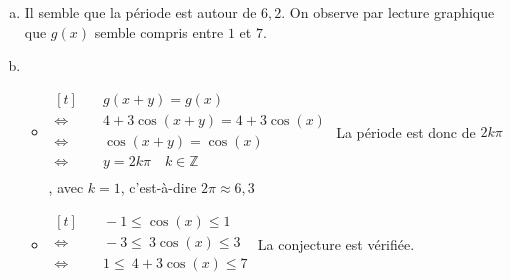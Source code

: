 \documentclass[12pt, a4paper]{article}
\begin{document}
\begin{Exercise}[number={88}]
    \begin{enumerate}[a)]
        \item Il semble que la période est autour de $6{,}2$. On observe par lecture graphique que $g(x)$ semble compris entre $1$ et $7$.
        \item   \begin{itemize}
                    \item   $\begin{aligned}[t]
                                &\quad g(x+y)=g(x) \\
                                \iff&\quad 4+3\cos(x+y)=4+3\cos(x) \\
                                \iff&\quad \cos(x+y)=\cos(x) \\
                                \iff&\quad y=2k\pi\quad k\in\mathbb{Z} \\
                            \end{aligned}$ \smallbreak
                            La période est donc de $2k\pi$, avec $k=1$, c'est-à-dire $2\pi\approx 6{,}3$ \medbreak
                    \item   $\begin{aligned}[t]
                                &\quad -1\leq\cos(x)\leq 1 \\
                                \iff&\quad -3\leq\ 3\cos(x)\leq 3 \\
                                \iff&\quad 1\leq\ 4+3\cos(x)\leq 7 \\
                            \end{aligned}$ \smallbreak
                            La conjecture est vérifiée. \medbreak
                \end{itemize}
    \end{enumerate}
\end{Exercise}
\end{document}
